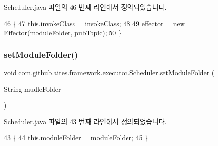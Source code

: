 Scheduler.\+java 파일의 46 번째 라인에서 정의되었습니다.


\begin{DoxyCode}
46                                                                                        \{
47         this.\mbox{\hyperlink{classcom_1_1github_1_1aites_1_1framework_1_1executor_1_1_scheduler_a4f3e7f2f469b4bdc442fb6c86a1a649b}{invokeClass}} = \mbox{\hyperlink{classcom_1_1github_1_1aites_1_1framework_1_1executor_1_1_scheduler_a4f3e7f2f469b4bdc442fb6c86a1a649b}{invokeClass}};
48         
49         effector = \textcolor{keyword}{new} Effector(\mbox{\hyperlink{classcom_1_1github_1_1aites_1_1framework_1_1executor_1_1_scheduler_a724e814b924f7495a611c27efa8b7616}{moduleFolder}}, pubTopic);
50     \}
\end{DoxyCode}
\mbox{\label{classcom_1_1github_1_1aites_1_1framework_1_1executor_1_1_scheduler_a8fea907cf1f00aed8787c888f70cf36e}} 
\subsubsection{\texorpdfstring{set\+Module\+Folder()}{setModuleFolder()}}
{\footnotesize\ttfamily void com.\+github.\+aites.\+framework.\+executor.\+Scheduler.\+set\+Module\+Folder (\begin{DoxyParamCaption}\item[{String}]{mudle\+Folder }\end{DoxyParamCaption})}



Scheduler.\+java 파일의 43 번째 라인에서 정의되었습니다.


\begin{DoxyCode}
43                                                    \{
44         this.\mbox{\hyperlink{classcom_1_1github_1_1aites_1_1framework_1_1executor_1_1_scheduler_a724e814b924f7495a611c27efa8b7616}{moduleFolder}} = \mbox{\hyperlink{classcom_1_1github_1_1aites_1_1framework_1_1executor_1_1_scheduler_a724e814b924f7495a611c27efa8b7616}{moduleFolder}};
45     \}
\end{DoxyCode}


